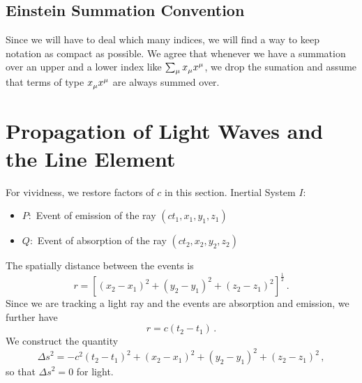 \subsection{Einstein Summation Convention}
Since we will have to deal which many indices, we will find a way to keep
notation as compact as possible. We agree that whenever we have a summation over an
upper and a lower index like $\sum_\mu \tensor{x}{_\mu}\tensor{x}{^\mu}$, we
drop the sumation and assume that terms of type
$\tensor{x}{_\mu}\tensor{x}{^\mu}$ are always summed over.
\section{Propagation of Light Waves and the Line Element}
For vividness, we restore factors of $c$ in this section.
Inertial System $I$:
\begin{itemize}
    \item $P:$ Event of emission of the ray $(ct_1,x_1,y_1,z_1)$
    \item $Q:$ Event of absorption of the ray $(ct_2,x_2,y_2,z_2)$
\end{itemize}
The spatially distance between the events is
\begin{equation}
    r=\left[(x_2-x_1)^2+(y_2-y_1)^2+(z_2-z_1)^2\right]^{\frac{1}{2}}\, .
\end{equation}
Since we are tracking a light ray and the events are absorption and emission, we
further have
\begin{equation}
    r=c(t_2-t_1)\, .
\end{equation}
We construct the quantity
\begin{equation}
    {\Delta s}^2=-c^2(t_2-t_1)^2+(x_2-x_1)^2+(y_2-y_1)^2+(z_2-z_1)^2\, ,
\end{equation}
so that ${\Delta s}^2=0$ for light.

